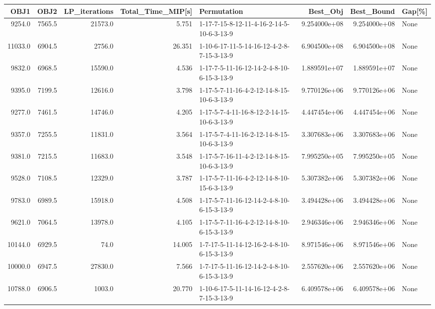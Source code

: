\begin{tabular}{rrrrlrrl}
\toprule
    OBJ1 &    OBJ2 &  LP\_iterations &  Total\_Time\_MIP[s] &                                Permutation &      Best\_Obj &    Best\_Bound & Gap[\%] \\
\midrule
  9254.0 &  7565.5 &        21573.0 &              5.751 &  1-17-7-15-8-12-11-4-16-2-14-5-10-6-3-13-9 &  9.254000e+08 &  9.254000e+08 &   None \\
 11033.0 &  6904.5 &         2756.0 &             26.351 &  1-10-6-17-11-5-14-16-12-4-2-8-7-15-3-13-9 &  6.904500e+08 &  6.904500e+08 &   None \\
  9832.0 &  6968.5 &        15590.0 &              4.536 &  1-17-7-5-11-16-12-14-2-4-8-10-6-15-3-13-9 &  1.889591e+07 &  1.889591e+07 &   None \\
  9395.0 &  7199.5 &        12616.0 &              3.798 &  1-17-5-7-11-16-4-2-12-14-8-15-10-6-3-13-9 &  9.770126e+06 &  9.770126e+06 &   None \\
  9277.0 &  7461.5 &        14746.0 &              4.205 &  1-17-5-7-4-11-16-8-12-2-14-15-10-6-3-13-9 &  4.447454e+06 &  4.447454e+06 &   None \\
  9357.0 &  7255.5 &        11831.0 &              3.564 &  1-17-5-7-4-11-16-2-12-14-8-15-10-6-3-13-9 &  3.307683e+06 &  3.307683e+06 &   None \\
  9381.0 &  7215.5 &        11683.0 &              3.548 &  1-17-5-7-16-11-4-2-12-14-8-15-10-6-3-13-9 &  7.995250e+05 &  7.995250e+05 &   None \\
  9528.0 &  7108.5 &        12329.0 &              3.787 &  1-17-5-7-11-16-4-2-12-14-8-10-15-6-3-13-9 &  5.307382e+06 &  5.307382e+06 &   None \\
  9783.0 &  6989.5 &        15918.0 &              4.508 &  1-17-5-7-11-16-12-14-2-4-8-10-6-15-3-13-9 &  3.494428e+06 &  3.494428e+06 &   None \\
  9621.0 &  7064.5 &        13978.0 &              4.105 &  1-17-5-7-11-16-4-2-12-14-8-10-6-15-3-13-9 &  2.946346e+06 &  2.946346e+06 &   None \\
 10144.0 &  6929.5 &           74.0 &             14.005 &  1-7-17-5-11-14-12-16-2-4-8-10-6-15-3-13-9 &  8.971546e+06 &  8.971546e+06 &   None \\
 10000.0 &  6947.5 &        27830.0 &              7.566 &  1-7-17-5-11-16-12-14-2-4-8-10-6-15-3-13-9 &  2.557620e+06 &  2.557620e+06 &   None \\
 10788.0 &  6906.5 &         1003.0 &             20.770 &  1-10-6-17-5-11-14-16-12-4-2-8-7-15-3-13-9 &  6.409578e+06 &  6.409578e+06 &   None \\
\bottomrule
\end{tabular}
